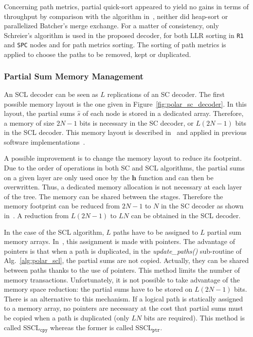 Concerning path metrics, partial quick-sort appeared to yield no gains in terms
of throughput by comparison with the algorithm in~\cite{Schreier1932}, neither
did heap-sort or parallelized Batcher's merge exchange. For a matter of
consistency, only Schreier's algorithm is used in the proposed decoder, for both
LLR sorting in \verb|R1| and \verb|SPC| nodes and for path metrics sorting. The
sorting of path metrics is applied to choose the paths to be removed, kept or
duplicated.

\subsubsection{Partial Sum Memory Management}

An SCL decoder can be seen as $L$ replications of an SC decoder. The first
possible memory layout is the one given in Figure~\ref{fig:polar_sc_decoder}. In
this layout, the partial sums $\hat{s}$ of each node is stored in a dedicated
array. Therefore, a memory of size $2N-1$ bits is necessary in the SC decoder,
or $L(2N -1)$ bits in the SCL decoder. This memory layout is described
in~\cite{Tal2011} and applied in previous software
implementations~\cite{Sarkis2014b,Sarkis2016,Shen2016}.

A possible improvement is to change the memory layout to reduce its footprint.
Due to the order of operations in both SC and SCL algorithms, the partial sums
on a given layer are only used once by the $\bm{h}$ function and can then be
overwritten. Thus, a dedicated memory allocation is not necessary at each layer
of the tree. The memory can be shared between the stages. Therefore the memory
footprint can be reduced from $2N-1$ to $N$ in the SC decoder as shown
in~\cite{Leroux2013}. A reduction from $L(2N -1)$ to $LN$ can be obtained in the
SCL decoder.

In the case of the SCL algorithm, $L$ paths have to be assigned to $L$ partial
sum memory arrays. In~\cite{Tal2011}, this assignment is made with pointers. The
advantage of pointers is that when a path is duplicated, in the
\textit{update\_paths()} sub-routine of Alg.~\ref{alg:polar_scl}, the partial
sums are not copied. Actually, they can be shared between paths thanks to the
use of pointers. This method limits the number of memory transactions.
Unfortunately, it is not possible to take advantage of the memory space
reduction: the partial sums have to be stored on $L(2N -1)$ bits. There is an
alternative to this mechanism. If a logical path is statically assigned to a
memory array, no pointers are necessary at the cost that partial sums must be
copied when a path is duplicated (only $LN$ bits are required). This method is
called SSCL$_{\texttt{cpy}}$ whereas the former is called SSCL$_{\texttt{ptr}}$.

